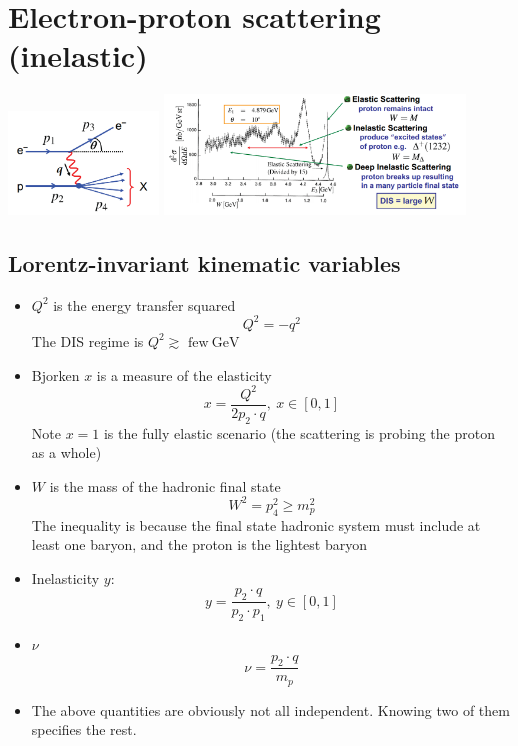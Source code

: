 \documentclass[11pt]{article}
\newcommand{\gev}{\text{GeV}}
\begin{document}
\section{Electron-proton scattering (inelastic)}
\begin{center}
  \includegraphics[width=0.3\textwidth]{figs/disfeyn.png}
  \includegraphics[width=0.6\textwidth]{figs/epxsec.png}
\end{center}
\subsection{Lorentz-invariant kinematic variables}
\begin{itemize}
  \item $Q^2$ is the energy transfer squared
  \begin{equation}
    Q^2 = -q^2
  \end{equation}
  The DIS regime is $Q^2\gtrsim \text{ few}~\gev$
  \item Bjorken $x$ is a measure of the elasticity
  \begin{equation}
    x = \frac{Q^2}{2p_2\cdot q}, ~ x\in [0,1]
  \end{equation}
  Note $x=1$ is the fully elastic scenario (the scattering is probing the proton as a whole)
  \item $W$ is the mass of the hadronic final state
  \begin{equation}
    W^2 = p_4^2 \geq m_p^2
  \end{equation}
  The inequality is because the final state hadronic system must include at least one baryon, and the proton is the lightest baryon
  \item Inelasticity $y$:
  \begin{equation}
    y = \frac{p_2\cdot q}{p_2\cdot p_1}, ~ y\in [0,1]
  \end{equation}
  \item $\nu$
  \begin{equation}
    \nu = \frac{p_2\cdot q}{m_p}
  \end{equation}
  \item The above quantities are obviously not all independent. Knowing two of them specifies the rest. 
\end{itemize}
\end{document}
